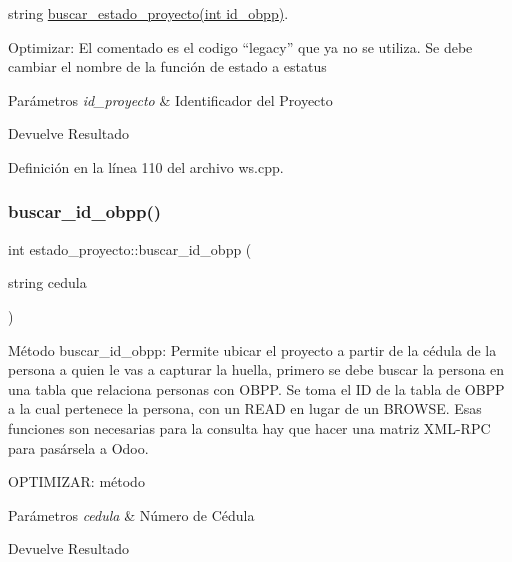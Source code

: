 string \hyperlink{classestado__proyecto_a888654e845012a36987ae8b1956f2841}{buscar\+\_\+estado\+\_\+proyecto(int id\+\_\+obpp)}.

Optimizar\+: El comentado es el codigo “legacy” que ya no se utiliza. Se debe cambiar el nombre de la función de estado a estatus 
\begin{DoxyParams}{Parámetros}
{\em id\+\_\+proyecto} & Identificador del Proyecto \\
\hline
\end{DoxyParams}
\begin{DoxyReturn}{Devuelve}
Resultado 
\end{DoxyReturn}


Definición en la línea 110 del archivo ws.\+cpp.

\hypertarget{classestado__proyecto_a9e5d463c32524544b33ac2f069d8eb13}{}\label{classestado__proyecto_a9e5d463c32524544b33ac2f069d8eb13} 
\subsubsection{\texorpdfstring{buscar\+\_\+id\+\_\+obpp()}{buscar\_id\_obpp()}}
{\footnotesize\ttfamily int estado\+\_\+proyecto\+::buscar\+\_\+id\+\_\+obpp (\begin{DoxyParamCaption}\item[{string}]{cedula }\end{DoxyParamCaption})}



Método buscar\+\_\+id\+\_\+obpp\+: Permite ubicar el proyecto a partir de la cédula de la persona a quien le vas a capturar la huella, primero se debe buscar la persona en una tabla que relaciona personas con O\+B\+PP. Se toma el ID de la tabla de O\+B\+PP a la cual pertenece la persona, con un R\+E\+AD en lugar de un B\+R\+O\+W\+SE. Esas funciones son necesarias para la consulta hay que hacer una matriz X\+M\+L-\/\+R\+PC para pasársela a Odoo. 

O\+P\+T\+I\+M\+I\+Z\+AR\+: método 
\begin{DoxyParams}{Parámetros}
{\em cedula} & Número de Cédula \\
\hline
\end{DoxyParams}
\begin{DoxyReturn}{Devuelve}
Resultado 
\end{DoxyReturn}


